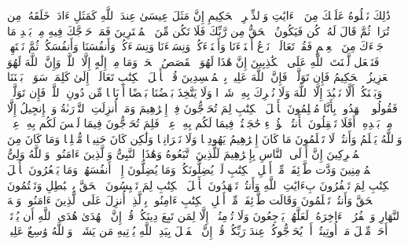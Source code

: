 \startbuffer[\q:3:58]
ذَٰلِكَ نَتۡلُوهُ عَلَیۡكَ مِنَ ٱلۡءَایَٰتِ وَٱلذِّكۡرِ ٱلۡحَكِیمِ%
\stopbuffer%
\startbuffer[\q:3:59]
إِنَّ مَثَلَ عِیسَىٰ عِندَ ٱللَّهِ كَمَثَلِ ءَادَمَۖ خَلَقَهُۥ مِن تُرَابࣲ ثُمَّ قَالَ لَهُۥ كُن فَیَكُونُ%
\stopbuffer%
\startbuffer[\q:3:60]
ٱلۡحَقُّ مِن رَّبِّكَ فَلَا تَكُن مِّنَ ٱلۡمُمۡتَرِینَ%
\stopbuffer%
\startbuffer[\q:3:61]
فَمَنۡ حَاۤجَّكَ فِیهِ مِنۢ بَعۡدِ مَا جَاۤءَكَ مِنَ ٱلۡعِلۡمِ فَقُلۡ تَعَالَوۡا۟ نَدۡعُ أَبۡنَاۤءَنَا وَأَبۡنَاۤءَكُمۡ وَنِسَاۤءَنَا وَنِسَاۤءَكُمۡ وَأَنفُسَنَا وَأَنفُسَكُمۡ ثُمَّ نَبۡتَهِلۡ فَنَجۡعَل لَّعۡنَتَ ٱللَّهِ عَلَى ٱلۡكَٰذِبِینَ%
\stopbuffer%
\startbuffer[\q:3:62]
إِنَّ هَٰذَا لَهُوَ ٱلۡقَصَصُ ٱلۡحَقُّۚ وَمَا مِنۡ إِلَٰهٍ إِلَّا ٱللَّهُۚ وَإِنَّ ٱللَّهَ لَهُوَ ٱلۡعَزِیزُ ٱلۡحَكِیمُ%
\stopbuffer%
\startbuffer[\q:3:63]
فَإِن تَوَلَّوۡا۟ فَإِنَّ ٱللَّهَ عَلِیمُۢ بِٱلۡمُفۡسِدِینَ%
\stopbuffer%
\startbuffer[\q:3:64]
قُلۡ یَٰۤأَهۡلَ ٱلۡكِتَٰبِ تَعَالَوۡا۟ إِلَىٰ كَلِمَةࣲ سَوَاۤءِۭ بَیۡنَنَا وَبَیۡنَكُمۡ أَلَّا نَعۡبُدَ إِلَّا ٱللَّهَ وَلَا نُشۡرِكَ بِهِۦ شَیۡءࣰا وَلَا یَتَّخِذَ بَعۡضُنَا بَعۡضًا أَرۡبَابࣰا مِّن دُونِ ٱللَّهِۚ فَإِن تَوَلَّوۡا۟ فَقُولُوا۟ ٱشۡهَدُوا۟ بِأَنَّا مُسۡلِمُونَ%
\stopbuffer%
\startbuffer[\q:3:65]
یَٰۤأَهۡلَ ٱلۡكِتَٰبِ لِمَ تُحَاۤجُّونَ فِیۤ إِبۡرَٰهِیمَ وَمَاۤ أُنزِلَتِ ٱلتَّوۡرَىٰةُ وَٱلۡإِنجِیلُ إِلَّا مِنۢ بَعۡدِهِۦۤۚ أَفَلَا تَعۡقِلُونَ%
\stopbuffer%
\startbuffer[\q:3:66]
هَٰۤأَنتُمۡ هَٰۤؤُلَاۤءِ حَٰجَجۡتُمۡ فِیمَا لَكُم بِهِۦ عِلۡمࣱ فَلِمَ تُحَاۤجُّونَ فِیمَا لَیۡسَ لَكُم بِهِۦ عِلۡمࣱۚ وَٱللَّهُ یَعۡلَمُ وَأَنتُمۡ لَا تَعۡلَمُونَ%
\stopbuffer%
\startbuffer[\q:3:67]
مَا كَانَ إِبۡرَٰهِیمُ یَهُودِیࣰّا وَلَا نَصۡرَانِیࣰّا وَلَٰكِن كَانَ حَنِیفࣰا مُّسۡلِمࣰا وَمَا كَانَ مِنَ ٱلۡمُشۡرِكِینَ%
\stopbuffer%
\startbuffer[\q:3:68]
إِنَّ أَوۡلَى ٱلنَّاسِ بِإِبۡرَٰهِیمَ لَلَّذِینَ ٱتَّبَعُوهُ وَهَٰذَا ٱلنَّبِیُّ وَٱلَّذِینَ ءَامَنُوا۟ۗ وَٱللَّهُ وَلِیُّ ٱلۡمُؤۡمِنِینَ%
\stopbuffer%
\startbuffer[\q:3:69]
وَدَّت طَّاۤئِفَةࣱ مِّنۡ أَهۡلِ ٱلۡكِتَٰبِ لَوۡ یُضِلُّونَكُمۡ وَمَا یُضِلُّونَ إِلَّاۤ أَنفُسَهُمۡ وَمَا یَشۡعُرُونَ%
\stopbuffer%
\startbuffer[\q:3:70]
یَٰۤأَهۡلَ ٱلۡكِتَٰبِ لِمَ تَكۡفُرُونَ بِءَایَٰتِ ٱللَّهِ وَأَنتُمۡ تَشۡهَدُونَ%
\stopbuffer%
\startbuffer[\q:3:71]
یَٰۤأَهۡلَ ٱلۡكِتَٰبِ لِمَ تَلۡبِسُونَ ٱلۡحَقَّ بِٱلۡبَٰطِلِ وَتَكۡتُمُونَ ٱلۡحَقَّ وَأَنتُمۡ تَعۡلَمُونَ%
\stopbuffer%
\startbuffer[\q:3:72]
وَقَالَت طَّاۤئِفَةࣱ مِّنۡ أَهۡلِ ٱلۡكِتَٰبِ ءَامِنُوا۟ بِٱلَّذِیۤ أُنزِلَ عَلَى ٱلَّذِینَ ءَامَنُوا۟ وَجۡهَ ٱلنَّهَارِ وَٱكۡفُرُوۤا۟ ءَاخِرَهُۥ لَعَلَّهُمۡ یَرۡجِعُونَ%
\stopbuffer%
\startbuffer[\q:3:73]
وَلَا تُؤۡمِنُوۤا۟ إِلَّا لِمَن تَبِعَ دِینَكُمۡ قُلۡ إِنَّ ٱلۡهُدَىٰ هُدَى ٱللَّهِ أَن یُؤۡتَىٰۤ أَحَدࣱ مِّثۡلَ مَاۤ أُوتِیتُمۡ أَوۡ یُحَاۤجُّوكُمۡ عِندَ رَبِّكُمۡۗ قُلۡ إِنَّ ٱلۡفَضۡلَ بِیَدِ ٱللَّهِ یُؤۡتِیهِ مَن یَشَاۤءُۗ وَٱللَّهُ وَٰسِعٌ عَلِیمࣱ%
